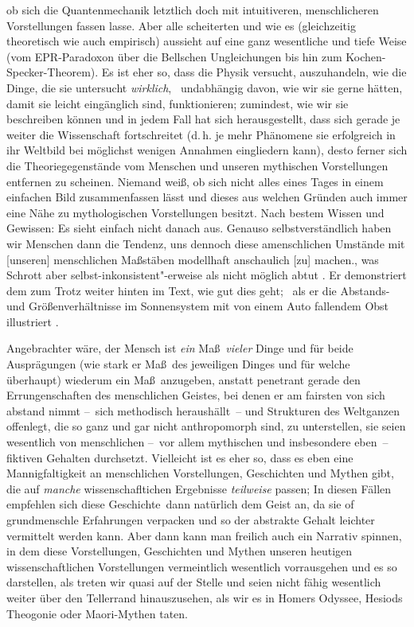   ob sich die Quantenmechanik letztlich doch mit intuitiveren, menschlicheren
  Vorstellungen fassen lasse.
Aber alle scheiterten und wie es (gleichzeitig
  theoretisch wie auch empirisch) aussieht auf eine ganz wesentliche und tiefe Weise
  (vom EPR-Paradoxon über die Bellschen Ungleichungen bis hin zum
  \mbox{Kochen-Specker-Theorem}).
Es ist eher so, dass die Physik versucht, auszuhandeln, wie die Dinge, die sie
  untersucht \emph{wirklich}, \dhei\ undabhängig davon, wie wir sie gerne hätten,
  damit sie leicht eingänglich sind, funktionieren; zumindest, wie wir sie beschreiben können
  und in jedem Fall hat sich herausgestellt, dass sich gerade je weiter die
  Wissenschaft fortschreitet (d.\,h. je mehr Phänomene sie erfolgreich in ihr
  Weltbild bei möglichst wenigen Annahmen eingliedern kann), desto ferner
  sich die Theoriegegenstände vom Menschen und unseren mythischen
  Vorstellungen entfernen zu scheinen.
Niemand weiß, ob sich nicht alles eines Tages in einem einfachen Bild
  zusammenfassen lässt und dieses aus welchen Gründen auch immer eine Nähe zu
  mythologischen Vorstellungen besitzt.
Nach bestem Wissen und Gewissen: Es sieht einfach nicht danach aus.
Genauso selbstverständlich haben wir Menschen dann die Tendenz, uns dennoch
  diese amenschlichen Umstände \glqq mit [unseren] menschlichen Maßstäben
  modellhaft anschaulich [zu] machen.\grqq, was Schrott aber
  selbst-inkonsistent"-erweise als nicht möglich abtut \citep[vgl. S. 5]{Schrott2016ErsteErde}. 
Er demonstriert dem zum Trotz weiter hinten im Text, wie gut dies geht; \ZB\
  als er die Abstands- und Größenverhältnisse im Sonnensystem mit von einem Auto fallendem
  Obst illustriert \citep[S. 48 f.]{Schrott2016ErsteErde}.


Angebrachter wäre, der Mensch ist \emph{ein} Ma\ss\ \emph{vieler} Dinge und für beide
  Ausprägungen (wie stark er Ma\ss\ des jeweiligen Dinges und für welche
  überhaupt) wiederum ein Ma\ss\ anzugeben, anstatt penetrant gerade den
  Errungenschaften des menschlichen Geistes, bei denen er am fairsten von sich
  abstand nimmt --~sich methodisch heraushällt~-- und Strukturen des
  Weltganzen offenlegt, die so ganz und gar nicht anthropomorph sind, zu
  unterstellen, sie seien wesentlich von menschlichen --~vor allem
  mythischen und insbesondere eben~-- fiktiven Gehalten durchsetzt.
Vielleicht ist es eher so, dass es eben eine Mannigfaltigkeit an menschlichen
  Vorstellungen, Geschichten und Mythen gibt, die auf \emph{manche}
  wissenschafltichen Ergebnisse \emph{teilweise} passen; In diesen Fällen
  empfehlen sich diese \glqq Geschichte\grqq\ dann natürlich dem Geist an, da
  sie of grundmenschle Erfahrungen verpacken und so der abstrakte Gehalt
  leichter vermittelt werden kann.
Aber dann kann man freilich auch ein Narrativ spinnen, in dem diese Vorstellungen,
  Geschichten und Mythen unseren heutigen wissenschaftlichen Vorstellungen vermeintlich
  wesentlich vorrausgehen und es so darstellen, als treten wir quasi auf der Stelle und
  seien nicht fähig wesentlich weiter über den Tellerrand hinauszusehen, als
  wir es in Homers Odyssee, Hesiods Theogonie oder Maori-Mythen taten.

